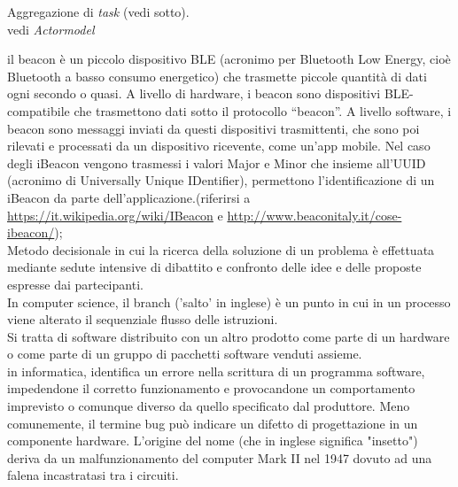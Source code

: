 \documentclass{scalatekids-article}
\begin{document}
 Aggregazione di \textit{task} (vedi sotto).
\\

  vedi \textit{Actormodel}
\\


 il beacon è un piccolo dispositivo BLE (acronimo per Bluetooth Low Energy, cioè Bluetooth a basso consumo energetico) che trasmette piccole quantità di dati ogni secondo o quasi.  A livello di hardware, i beacon sono dispositivi BLE-compatibile che trasmettono dati sotto il protocollo “beacon”.
A livello software, i beacon sono messaggi inviati da questi dispositivi trasmittenti, che sono poi rilevati e processati da un dispositivo ricevente, come un’app mobile. Nel caso degli iBeacon vengono trasmessi i valori Major e Minor che insieme all’UUID (acronimo di Universally Unique IDentifier), permettono l’identificazione di un iBeacon da parte dell’applicazione.(riferirsi a \url{https://it.wikipedia.org/wiki/IBeacon} e \url{http://www.beaconitaly.it/cose-ibeacon/});
\\

 Metodo decisionale in cui la ricerca della soluzione di un problema è effettuata mediante sedute intensive di dibattito e confronto delle idee e delle proposte espresse dai partecipanti.
\\

 In computer science, il branch ('salto' in inglese) è un punto in cui in un processo viene alterato il sequenziale flusso delle istruzioni.
\\

 Si tratta di software distribuito con un altro prodotto come parte di un hardware o come parte di un gruppo di pacchetti software venduti assieme.
\\

 in informatica, identifica un errore nella scrittura di un programma software, impedendone il corretto funzionamento e provocandone un comportamento imprevisto o comunque diverso da quello specificato dal produttore. Meno comunemente, il termine bug può indicare un difetto di progettazione in un componente hardware.
L'origine del nome (che in inglese significa "insetto") deriva da un malfunzionamento del computer Mark II nel 1947 dovuto ad una falena incastratasi tra i circuiti.
\\

\end{document}
